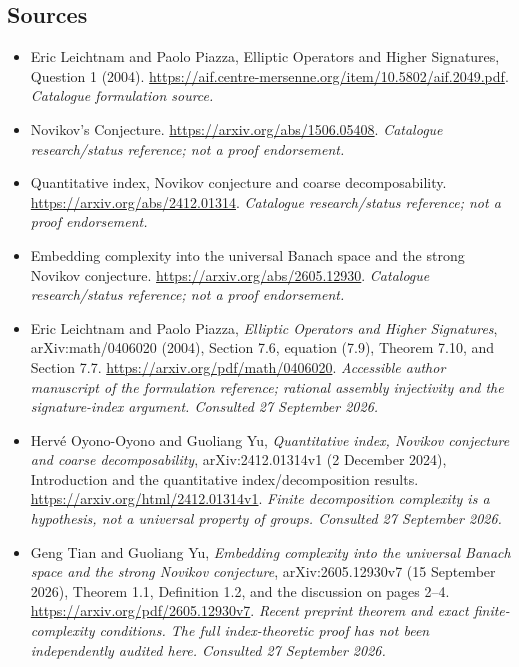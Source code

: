 \documentclass[11pt,a4paper]{article}
\numberwithin{equation}{section}
\begin{document}
\subsection{Sources}
\begin{itemize}\raggedright
\item[\textnormal{[S1]}]\hypertarget{source:statement:1}{} Eric Leichtnam and Paolo Piazza, Elliptic Operators and Higher Signatures, Question 1 (2004).
\url{https://aif.centre-mersenne.org/item/10.5802/aif.2049.pdf}.
{\small\textit{Catalogue formulation source.}}
\item[\textnormal{[S2]}]\hypertarget{source:statement:2}{} Novikov's Conjecture.
\url{https://arxiv.org/abs/1506.05408}.
{\small\textit{Catalogue research/status reference; not a proof endorsement.}}
\item[\textnormal{[S3]}]\hypertarget{source:statement:3}{} Quantitative index, Novikov conjecture and coarse decomposability.
\url{https://arxiv.org/abs/2412.01314}.
{\small\textit{Catalogue research/status reference; not a proof endorsement.}}
\item[\textnormal{[S4]}]\hypertarget{source:statement:4}{} Embedding complexity into the universal Banach space and the strong Novikov conjecture.
\url{https://arxiv.org/abs/2605.12930}.
{\small\textit{Catalogue research/status reference; not a proof endorsement.}}

\item[\textnormal{[E1]}]\hypertarget{extra:statement:1}{} Eric Leichtnam and Paolo Piazza, \emph{Elliptic Operators and Higher Signatures}, arXiv:math/0406020 (2004), Section 7.6, equation (7.9), Theorem 7.10, and Section 7.7.
\url{https://arxiv.org/pdf/math/0406020}.
{\small\textit{Accessible author manuscript of the formulation reference; rational assembly injectivity and the signature-index argument. Consulted 27 September 2026.}}
\item[\textnormal{[E2]}]\hypertarget{extra:statement:2}{} Herv\'e Oyono-Oyono and Guoliang Yu, \emph{Quantitative index, Novikov conjecture and coarse decomposability}, arXiv:2412.01314v1 (2 December 2024), Introduction and the quantitative index/decomposition results.
\url{https://arxiv.org/html/2412.01314v1}.
{\small\textit{Finite decomposition complexity is a hypothesis, not a universal property of groups. Consulted 27 September 2026.}}
\item[\textnormal{[E3]}]\hypertarget{extra:statement:3}{} Geng Tian and Guoliang Yu, \emph{Embedding complexity into the universal Banach space and the strong Novikov conjecture}, arXiv:2605.12930v7 (15 September 2026), Theorem 1.1, Definition 1.2, and the discussion on pages 2--4.
\url{https://arxiv.org/pdf/2605.12930v7}.
{\small\textit{Recent preprint theorem and exact finite-complexity conditions. The full index-theoretic proof has not been independently audited here. Consulted 27 September 2026.}}
\end{itemize}
\end{document}
